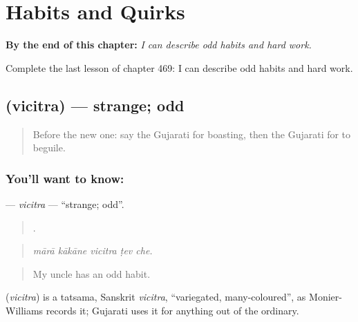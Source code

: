 
\chapter{Habits and Quirks}
\label{ch:gu-habits-and-quirks}

\begin{chapteropening}
\textbf{By the end of this chapter:} \emph{I can describe odd habits and hard work.}

Complete the last lesson of chapter 469: I can describe odd habits and hard work.
\end{chapteropening}

\section[\texorpdfstring{\gu{વિચિત્ર} (vicitra)}{વિચિત્ર (vicitra)}]{ (vicitra) — strange; odd}

\label{lesson:GU-C469-vicitra}



\begin{quote}
Before the new one: say the Gujarati for boasting, then the Gujarati for to beguile.
\end{quote}

\subsection*{You'll want to know: }
\textbf{} — \emph{vicitra} — \textquotedblleft{}strange; odd\textquotedblright{}.

\begin{quote}
    .
\end{quote}

\begin{quote}
\emph{mārā kākāne vicitra ṭev che.}
\end{quote}

\begin{quote}
My uncle has an odd habit.
\end{quote}

\begin{cousinweb}
\textbf{} (\emph{vicitra}) is a tatsama, Sanskrit \emph{vicitra}, \textquotedblleft{}variegated, many-coloured\textquotedblright{}, as Monier-Williams records it; Gujarati uses it for anything out of the ordinary.
\end{cousinweb}

